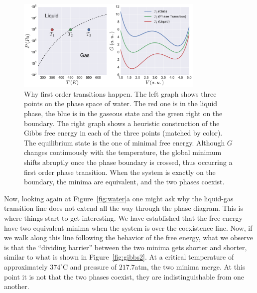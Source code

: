 \begin{figure}[t]
\begin{center}
    \includegraphics[width=0.8\textwidth]{chapters/ch2-crit/figs/gibbs1}
\end{center}
\caption{Why first order transitions happen. The left graph shows three points
    on the phase space of water. The red one is in the liquid phase, the blue
    is in the gaseous state and the green right on the boundary. The right
    graph shows a heuristic construction of the Gibbs free energy in each of
    the three points (matched by color). The equilibrium state is the one of
    minimal free energy. Although $G$ changes continuously with the
    temperature, the global minimum shifts abruptly once the phase boundary is
    crossed, thus occurring a first order phase transition. When the system is
    exactly on the boundary, the minima are equivalent, and the two phases
    coexist.}
\label{fig:gibbs1}
\end{figure}

Now, looking again at Figure~\ref{fig:water}a one might ask why the liquid-gas
transition line does not extend all the way through the phase diagram. This
is where things start to get interesting. We have established that the free
energy have two equivalent minima when the system is over the coexistence line.
Now, if we walk along this line following the behavior of the free energy, what
we observe is that the ``dividing barrier'' between  the two minima gets shorter
and shorter, similar to what is shown in Figure~\ref{fig:gibbs2}. At a critical
temperature of approximately $374^\circ$C and pressure of $217.7$atm, the two
minima merge. At this point it is not that the two phases coexist, they are
indistinguishable from one another.

